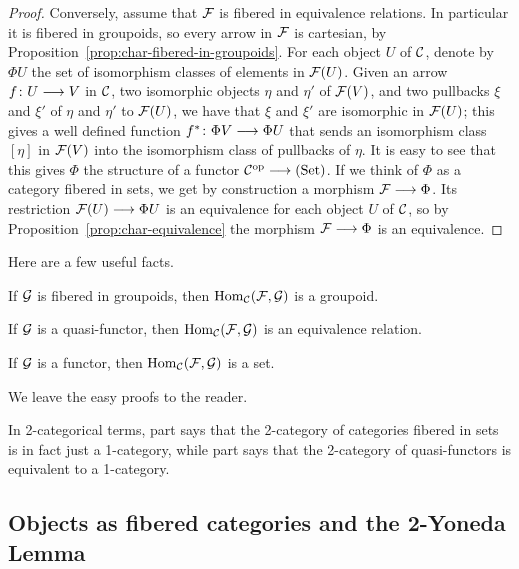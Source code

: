 \begin{3   FIBERED CATEGORIES}
\begin{3.5 Equivalences of fibered categories}
\begin{proof}
Conversely, assume that $\mathcal{F}$ is fibered in equivalence relations. In particular it is fibered in groupoids, so every arrow in $\mathcal{F}$ is cartesian, by Proposition~\ref{prop:char-fibered-in-groupoids}. For each object $U$ of $\mathcal{C}$, denote by $\Phi U$ the set of isomorphism classes of elements in $\mathcal{F}(U)$. Given an arrow $f \colon U \arr V$ in $\mathcal{C}$, two isomorphic objects $\eta$ and $\eta'$ of $\mathcal{F}(V)$, and two pullbacks $\xi$ and $\xi'$ of $\eta$ and $\eta'$ to $\mathcal{F}(U)$, we have that $\xi$ and $\xi'$ are isomorphic in $\mathcal{F}(U)$; this gives a well defined function $f^* \colon \Phi V \arr \Phi U$ that sends an isomorphism class $[\eta]$ in $\mathcal{F}(V)$ into the isomorphism class of pullbacks of $\eta$. It is easy to see that this gives $\Phi$  the structure of a functor $\cC\op \arr \catset$. If we think of $\Phi$ as a category fibered in sets, we get by construction a morphism $\cF \arr \Phi$. Its restriction $\cF(U) \arr \Phi U$ is an equivalence for each object $U$ of $\mathcal{C}$, so by Proposition~\ref{prop:char-equivalence} the morphism $\cF \arr \Phi$ is an equivalence.
\end{proof}



Here are a few useful facts.

\begin{proposition}\hfil
\begin{enumeratei}

 If $\mathcal{G}$ is fibered in groupoids, then $\operatorname{Hom}_{\mathcal{C}}(\mathcal{F}, \mathcal{G})$ is a groupoid.

 If $\mathcal{G}$ is a quasi-functor, then $\operatorname{Hom}_{\mathcal{C}}(\mathcal{F}, \mathcal{G})$ is an equivalence relation.

 If $\mathcal{G}$ is a functor, then $\operatorname{Hom}_{\mathcal{C}}(\mathcal{F}, \mathcal{G})$ is a set.

\end{enumeratei}
\end{proposition}

We leave the easy proofs to the reader.

In 2-categorical terms, part  says that the 2-category of categories fibered in sets is in fact just a 1-category, while part  says that the 2-category of quasi-functors is equivalent to a 1-category.

\end{3.5 Equivalences of fibered categories}
\begin{3.6 Objects as fibcats and the 2-Yoneda}
\setcounter{section}{5}
\section{Objects as fibered categories and the 2-Yoneda Lemma}
\setcounter{theorem}{42}

\end{3.6 Objects as fibcats and the 2-Yoneda}
\end{3   FIBERED CATEGORIES}
